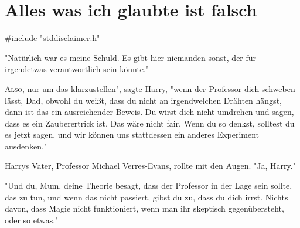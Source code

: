 \chapter{Alles was ich glaubte ist falsch}

\begin{chapterOpeningAuthorNote}
\#include "stddisclaimer.h"
\end{chapterOpeningAuthorNote}

\begin{chapterOpeningQuote}
"Natürlich war es meine Schuld. Es gibt hier niemanden sonst, der für irgendetwas verantwortlich sein könnte."
\end{chapterOpeningQuote}

\lettrine[ante="]{A}{lso}, nur um das klarzustellen", sagte Harry, "wenn der Professor dich schweben lässt, Dad, obwohl du weißt, dass du nicht an irgendwelchen Drähten hängst, dann ist das ein ausreichender Beweis. Du wirst dich nicht umdrehen und sagen, dass es ein Zauberertrick ist. Das wäre nicht fair. Wenn du so denkst, solltest du es jetzt sagen, und wir können uns stattdessen ein anderes Experiment ausdenken."

Harrys Vater, Professor Michael Verres-Evans, rollte mit den Augen. "Ja, Harry."

"Und du, Mum, deine Theorie besagt, dass der Professor in der Lage sein sollte, das zu tun, und wenn das nicht passiert, gibst du zu, dass du dich irrst. Nichts davon, dass Magie nicht funktioniert, wenn man ihr skeptisch gegenübersteht, oder so etwas."

